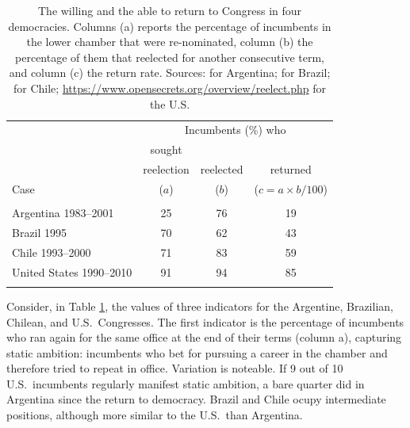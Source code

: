 \documentclass[letter,12pt]{article}
\newcommand{\mc}{\multicolumn}
\begin{document}
\begin{table}
  \centering
  \begin{tabular}{lccc}
                             & \mc{3}{c}{Incumbents (\%) who} \\ 
                             & sought      &             &            \\ [-.5ex]
                             & reelection  & reelected   & returned   \\ [-.5ex]
    Case                     & ($a$)       & ($b$)       & ($c=a\times b/100$) \\ \hline \\ [-1.25ex] 
    Argentina 1983--2001     & 25          &  76         &     19     \\
    Brazil 1995              & 70          &  62         &     43     \\
    Chile 1993--2000         & 71          &  83         &     59     \\
    United States 1990--2010 & 91          &  94         &     85     \\ \\ [-1.25ex] \hline
  \end{tabular}
  \caption{The willing and the able to return to Congress in four democracies. Columns (a) reports the percentage of incumbents in the lower chamber that were re-nominated, column (b) the percentage of them that reelected for another consecutive term, and column (c) the return rate. Sources: \citet[][:658]{jones.etal.amateurLegis.2002} for Argentina; \citet[][:415--6]{morgenstern.2002b} for Brazil; \citet{naviaIncumbency.2000} for Chile; \protect\url{https://www.opensecrets.org/overview/reelect.php} for the U.S.}\label{T:retRate}
\end{table}

Consider, in Table \ref{T:retRate}, the values of three indicators for the Argentine, Brazilian, Chilean, and U.S.\ Congresses. The first indicator is the percentage of incumbents who ran again for the same office at the end of their terms (column a), capturing  static ambition: incumbents who bet for pursuing a career in the chamber and therefore tried to repeat in office. Variation is noteable. If 9 out of 10 U.S.\ incumbents regularly manifest static ambition, a bare quarter did in Argentina since the return to democracy. Brazil and Chile ocupy intermediate positions, although more similar to the U.S.\ than Argentina. 
\end{document}
